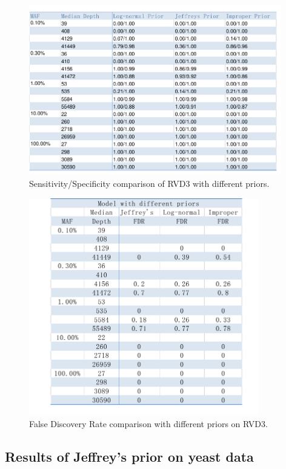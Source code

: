 \documentclass[11pt,reqno]{amsart}
\begin{document}
\begin{figure}[htbp]
\begin{center}
\includegraphics[width=110mm]{tables/Sen_Speci.pdf}
\caption{Sensitivity/Specificity comparison of RVD3 with different priors.}
\label{fig:SS}
\end{center}
\end{figure}


\begin{figure}[htbp]
\begin{center}
\includegraphics[width=100mm]{tables/FDR.pdf}
\caption{False Discovery Rate comparison with different priors on RVD3.}
\label{fig:fdr}
\end{center}
\end{figure}

\subsection{Results of Jeffrey's prior on yeast data}
\end{document}
